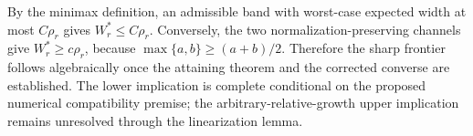 By the minimax definition, an admissible band with worst-case expected width at most \(C\rho_r\) gives \(W_r^*\le C\rho_r\).  Conversely, the two normalization-preserving channels give \(W_r^*\ge c\rho_r\), because \(\max\{a,b\}\ge(a+b)/2\).  Therefore the sharp frontier follows algebraically once the attaining theorem and the corrected converse are established.  The lower implication is complete conditional on the proposed numerical compatibility premise; the arbitrary-relative-growth upper implication remains unresolved through the linearization lemma.